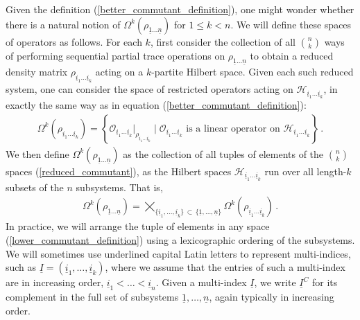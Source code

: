 \documentclass[12pt]{article}
\newcommand{\ul}[1]{{\underline{#1}}}
\numberwithin{equation}{section}
\begin{document}
Given the definition (\ref{better_commutant_definition}), one might wonder whether there is a natural notion of $\Omega^k \left( \rho_{\ul{1} \ldots \ul{n}} \right)$ for $1 \leq k < n$. We will define these spaces of operators as follows. For each $k$, first consider the collection of all ${n \choose k}$ ways of performing sequential partial trace operations on $\rho_{\ul{1} \ldots \ul{n}}$ to obtain a reduced density matrix $\rho_{\ul{i}_1 \ldots \ul{i}_k}$ acting on a $k$-partite Hilbert space. Given each such reduced system, one can consider the space of restricted operators acting on $\mathcal{H}_{\ul{i}_1 \ldots \ul{i}_k}$, in exactly the same way as in equation (\ref{better_commutant_definition}):
%
\begin{align}\label{reduced_commutant}
    \Omega^k \left( \rho_{\ul{i}_1 \ldots \ul{i}_k} \right) = \left\{ \mathcal{O}_{\ul{i}_1 \ldots \ul{i}_k} \big\vert_{\rho_{\ul{i}_1 \ldots \ul{i}_k}} \mid \mathcal{O}_{\ul{i}_1 \ldots \ul{i}_k} \text{ is a linear operator on } \mathcal{H}_{\ul{i}_1 \ldots \ul{i}_k} \right\} \, .
\end{align}
%
We then define $\Omega^k \left( \rho_{\ul{1} \ldots \ul{n}} \right)$ as the collection of all tuples of elements of the ${n \choose k}$ spaces (\ref{reduced_commutant}), as the Hilbert spaces $\mathcal{H}_{\ul{i}_1 \ldots \ul{i}_k}$ run over all length-$k$ subsets of the $n$ subsystems. That is,
%
\begin{align}\label{lower_commutant_definition}
    \Omega^k \left( \rho_{\ul{1} \ldots \ul{n}} \right) = \bigtimes_{ \{ \ul{i}_1 , \ldots , \ul{i}_k \} \, \subset \, \{ \ul{1} , \ldots , \ul{n} \} } \Omega^k \left( \rho_{\ul{i}_1 \ldots \ul{i}_k} \right) \, .
\end{align}
%
In practice, we will arrange the tuple of elements in any space (\ref{lower_commutant_definition}) using a lexicographic ordering of the subsystems. We will sometimes use underlined capital Latin letters to represent multi-indices, such as $\ul{I} = ( \ul{i}_1 , \ldots , \ul{i}_k )$, where we assume that the entries of such a multi-index are in increasing order, $\ul{i}_1 < \ldots < \ul{i}_n$. Given a multi-index $\ul{I}$, we write $\ul{I}^C$ for its complement in the full set of subsystems $\ul{1} , \ldots , \ul{n}$, again typically in increasing order.
\end{document}
